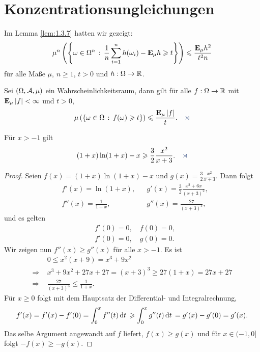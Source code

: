 \chapter{Konzentrationsungleichungen}

Im Lemma \ref{lem:1.3.7} hatten wir gezeigt:
\begin{align*}
\mu^n\left(\setdef{\omega\in\Omega^n}{\frac{1}{n}\sum_{i=1}^n
h(\omega_i)-\E_\mu h \ge t} \right) \le \frac{\E_\mu h^2}{t^2n}
\end{align*}
für alle Maße $\mu$, $n\ge 1$, $t>0$ und $h: \Omega\to\R$.

\begin{prop}
\label{prop:3.1}
Sei $(\Omega,\AA,\mu)$ ein Wahrscheinlichkeitsraum, dann gilt für alle $f:
\Omega\to\R$ mit $\E_\mu \abs{f}< \infty$ und $t>0$,
\begin{align*}
\mu\left(\setdef{\omega\in\Omega}{f(\omega)\ge t} \right)
\le \frac{\E_\mu \abs{f}}{t}.\fishhere
\end{align*}
\end{prop}

\begin{lem}
\label{prop:3.2}
Für $x>-1$ gilt
\begin{align*}
(1+x)\ln(1+x) -x \ge \frac{3}{2}\frac{x^2}{x+3}.\fishhere
\end{align*}
\end{lem}
\begin{proof}
Seien $f(x) = (1+x)\ln(1+x)-x$ und $g(x) = \frac{3}{2}\frac{x^2}{x+3}$. Dann
folgt
\begin{align*}
&f'(x) = \ln(1+x), && g'(x) = \frac{3}{2}\frac{x^2+6x}{(x+3)^2},\\
&f''(x) = \frac{1}{1+x}, && g''(x) = \frac{27}{(x+3)^3}, 
\end{align*}
und es gelten
\begin{align*}
&f'(0) = 0,\quad f(0) = 0,\\
&f'(0) = 0, \quad g(0) = 0. 
\end{align*}
Wir zeigen nun $f''(x)\ge g''(x)$ für alle $x>-1$. Es ist
\begin{align*}
&0 \le x^2(x+9) = x^3+9x^2\\
\Rightarrow\;
&x^3+9x^2+27x+27 = (x+3)^3 \ge  27(1+x) = 27x + 27\\
\Rightarrow\;
&\frac{27}{(x+3)^3} \le \frac{1}{1+x}.
\end{align*}
Für $x\ge 0$ folgt mit dem Hauptsatz der Differential- und Integralrechnung,
\begin{align*}
f'(x) = f'(x)-f'(0) = \int_0^x f''(t)\dt
\ge \int_0^x g''(t)\dt = g'(x)-g'(0) = g'(x).
\end{align*}
Das selbe Argument angewandt auf $f$ liefert, $f(x) \ge g(x)$ und für $x\in
(-1,0]$ folgt $-f(x) \ge -g(x)$.\qedhere
\end{proof}

